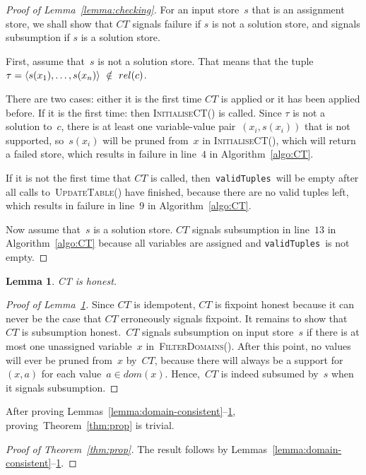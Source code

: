 \documentclass[a4paper,11pt]{article}
\newtheorem{lemma}[theorem]{Lemma}
\newcommand{\Algoref}[1]{Algorithm~\ref{#1}}
\newcommand{\Thmref}[1]{Theorem~\ref{#1}}
\newcommand{\Lemmaref}[1]{Lemma~\ref{#1}}
\newcommand{\CurrTable}{\texttt{validTuples}}
\def\UpdateTable{\textsc{UpdateTable}}
\def\FilterDomains{\textsc{FilterDomains}}
\def\InitialiseCT{\textsc{InitialiseCT}}
\numberwithin{equation}{section}
\begin{document}
\begin{proof}[Proof of \Lemmaref{lemma:checking}]
  For an input store~$s$ that is an assignment store, we shall show that $CT$
  signals failure if $s$ is not a solution store, and signals subsumption if
  $s$ is a solution store. 

  First, assume that~$s$ is not a solution store. That means that the tuple
  $\tau = \left\langle s(x_1),\ldots,s(x_n)\right\rangle~\notin~rel(c)$.
 
  There are two cases: either
  it is the first time $CT$ is applied or it has been applied before.
  If it is the first time: then \InitialiseCT() is called.
  Since $\tau$ is not a solution to~$c$, there is at least one variable-value
  pair~$(x_i,s(x_i))$ that is not supported, so~$s(x_i)$ will be pruned
  from~$x$ in \InitialiseCT(), which will return a failed store, which results
  in failure in line~$4$ in \Algoref{algo:CT}.

  If it is not the first time that $CT$ is called, then~\CurrTable~will be empty
  after all calls to~\UpdateTable() have finished, because there are no
  valid tuples left, which results in failure in line~$9$ in \Algoref{algo:CT}.
  
  Now assume that~$s$ is a solution store. 
  $CT$ signals subsumption in line~$13$ in \Algoref{algo:CT} because all
  variables are assigned and \CurrTable~is not empty.
\end{proof}

\begin{lemma}\label{lemma:honest}
  CT is honest.
\end{lemma}

\begin{proof}[Proof of \Lemmaref{lemma:honest}]
  Since $CT$ is idempotent, $CT$ is fixpoint honest because it can never be the
  case that $CT$ erroneously signals fixpoint.
  It remains to show that
  $CT$ is subsumption honest.~$CT$ signals subsumption on input store~$s$
  if there is at most one
  unassigned variable~$x$ in~\FilterDomains(). After this point, no values will
  ever be pruned from~$x$ by~$CT$, because there will always be a support for
  $(x,a)$ for each value~$a \in dom(x)$. Hence,~$CT$ is indeed subsumed by~$s$
  when it signals subsumption.
\end{proof}

After proving Lemmas~\ref{lemma:domain-consistent}--\ref{lemma:honest},
proving~\Thmref{thm:prop} is trivial.

\begin{proof}[Proof of \Thmref{thm:prop}]
  The result follows by Lemmas~\ref{lemma:domain-consistent}--\ref{lemma:honest}.
\end{proof}
\end{document}
